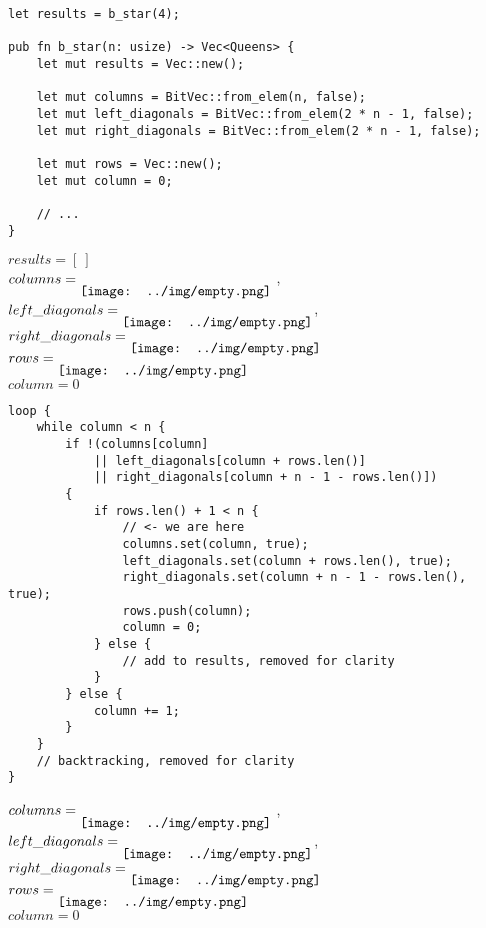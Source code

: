 \begin{frame}[fragile]
    \begin{verbatim}
let results = b_star(4);

pub fn b_star(n: usize) -> Vec<Queens> {
    let mut results = Vec::new();

    let mut columns = BitVec::from_elem(n, false);
    let mut left_diagonals = BitVec::from_elem(2 * n - 1, false);
    let mut right_diagonals = BitVec::from_elem(2 * n - 1, false);

    let mut rows = Vec::new();
    let mut column = 0;

    // ...
}
    \end{verbatim}
    $results = [\ ]$\\
    $columns = \raisebox{-2ex}{\texttt{[image: ../img/empty.png]}}$ ,
    $left\_diagonals = \raisebox{-2ex}{\texttt{[image: ../img/empty.png]}}$,
    $right\_diagonals = \raisebox{-2ex}{\texttt{[image: ../img/empty.png]}}$ \\
    $rows = \raisebox{-2ex}{\texttt{[image: ../img/empty.png]}}$ \\
    $column = 0$
\end{frame}
\begin{frame}[fragile]
    \begin{verbatim}
loop {
    while column < n {
        if !(columns[column]
            || left_diagonals[column + rows.len()]
            || right_diagonals[column + n - 1 - rows.len()])
        {
            if rows.len() + 1 < n {
                // <- we are here
                columns.set(column, true);
                left_diagonals.set(column + rows.len(), true);
                right_diagonals.set(column + n - 1 - rows.len(), true);
                rows.push(column);
                column = 0;
            } else {
                // add to results, removed for clarity
            }
        } else {
            column += 1;
        }
    }
    // backtracking, removed for clarity
}
    \end{verbatim}
    $columns = \raisebox{-2ex}{\texttt{[image: ../img/empty.png]}}$ ,
    $left\_diagonals = \raisebox{-2ex}{\texttt{[image: ../img/empty.png]}}$,
    $right\_diagonals = \raisebox{-2ex}{\texttt{[image: ../img/empty.png]}}$ \\
    $rows = \raisebox{-2ex}{\texttt{[image: ../img/empty.png]}}$ \\
    $column = 0$
\end{frame}
